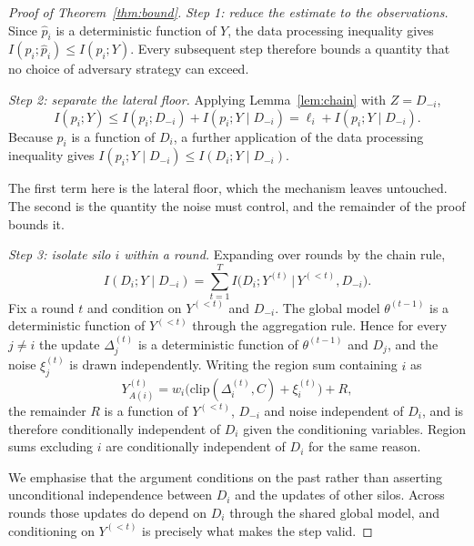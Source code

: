 \documentclass[acmsmall,screen,review,anonymous]{acmart}
\theoremstyle{acmdefinition}%
\begin{document}
\begin{proof}[Proof of Theorem~\ref{thm:bound}]
\emph{Step 1: reduce the estimate to the observations.}
Since $\hat{p}_i$ is a deterministic function of $Y$, the data processing
inequality gives $I(p_i ; \hat{p}_i) \le I(p_i ; Y)$. Every subsequent step
therefore bounds a quantity that no choice of adversary strategy can exceed.

\emph{Step 2: separate the lateral floor.} Applying
Lemma~\ref{lem:chain} with $Z = D_{-i}$,
\begin{equation}
I(p_i ; Y) \le I(p_i ; D_{-i}) + I(p_i ; Y \mid D_{-i})
= \ell_i + I(p_i ; Y \mid D_{-i}).
\end{equation}
Because $p_i$ is a function of $D_i$, a further application of the data processing
inequality gives $I(p_i ; Y \mid D_{-i}) \le I(D_i ; Y \mid D_{-i})$.

The first term here is the lateral floor, which the mechanism leaves untouched.
The second is the quantity the noise must control, and the remainder of the proof
bounds it.

\emph{Step 3: isolate silo $i$ within a round.} Expanding over rounds by the chain rule,
\begin{equation}
I(D_i ; Y \mid D_{-i}) = \sum_{t=1}^{T} I\big(D_i ; Y^{(t)} \,\big|\, Y^{(<t)}, D_{-i}\big).
\end{equation}
Fix a round $t$ and condition on $Y^{(<t)}$ and $D_{-i}$. The global model
$\theta^{(t-1)}$ is a deterministic function of $Y^{(<t)}$ through the aggregation
rule. Hence for every $j \ne i$ the update $\Delta_j^{(t)}$ is a deterministic
function of $\theta^{(t-1)}$ and $D_j$, and the noise $\xi_j^{(t)}$ is drawn
independently. Writing the region sum containing $i$ as
\begin{equation}
Y_{A(i)}^{(t)} = w_i \big(\mathrm{clip}(\Delta_i^{(t)}, C) + \xi_i^{(t)}\big) + R,
\end{equation}
the remainder $R$ is a function of $Y^{(<t)}$, $D_{-i}$ and noise independent of
$D_i$, and is therefore conditionally independent of $D_i$ given the conditioning
variables. Region sums excluding $i$ are conditionally independent of $D_i$ for
the same reason.

We emphasise that the argument conditions on the past rather than asserting
unconditional independence between $D_i$ and the updates of other silos. Across
rounds those updates do depend on $D_i$ through the shared global model, and
conditioning on $Y^{(<t)}$ is precisely what makes the step valid.


\end{proof}
\end{document}
